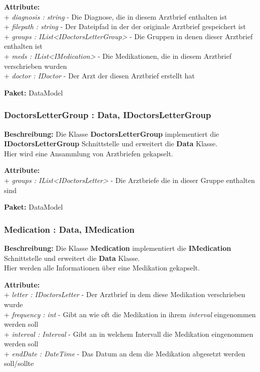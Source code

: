 \documentclass[a4paper]{scrreprt}
\begin{document}
\textbf{Attribute:}\\ 
+ \textit{diagnosis : string} - Die Diagnose, die in diesem Arztbrief enthalten ist\\
+ \textit{filepath : string} - Der Dateipfad in der der originale Arztbrief gespeichert ist\\
+ \textit{groups : IList<IDoctorsLetterGroup>} - Die Gruppen in denen dieser Arztbrief enthalten ist\\
+ \textit{meds : IList<IMedication>} - Die Medikationen, die in diesem Arztbrief verschrieben wurden\\
+ \textit{doctor : IDoctor} - Der Arzt der diesen Arztbrief erstellt hat

\textbf{Paket:} DataModel

\subsubsection{DoctorsLetterGroup : Data, IDoctorsLetterGroup}
\textbf{Beschreibung:} Die Klasse \textbf{DoctorsLetterGroup} implementiert die \textbf{IDoctorsLetterGroup} Schnittstelle und erweitert die \textbf{Data} Klasse.\\
Hier wird eine Ansammlung von Arztbriefen gekapselt.

\textbf{Attribute:}\\
+ \textit{groups : IList<IDoctorsLetter>} - Die Arztbriefe die in dieser Gruppe enthalten sind

\textbf{Paket:} DataModel

\subsubsection{Medication : Data, IMedication}
\textbf{Beschreibung:} Die Klasse \textbf{Medication} implementiert die \textbf{IMedication} Schnittstelle und erweitert die \textbf{Data} Klasse.\\
Hier werden alle Informationen über eine Medikation gekapselt.

\textbf{Attribute:}\\
+ \textit{letter : IDoctorsLetter} - Der Arztbrief in dem diese Medikation verschrieben wurde\\
+ \textit{frequency : int} - Gibt an wie oft die Medikation in ihrem \textit{interval} eingenommen werden soll\\
+ \textit{interval : Interval} - Gibt an in welchem Intervall die Medikation eingenommen werden soll\\
+ \textit{endDate : DateTime} - Das Datum an dem die Medikation abgesetzt werden soll/sollte
\end{document}
